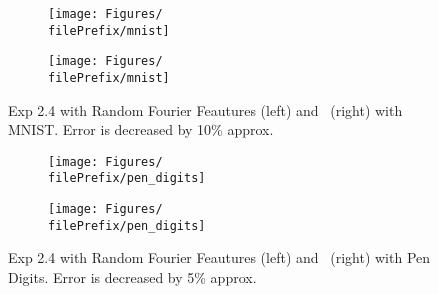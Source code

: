\begin{figure}[H]
  \centering
  \renewcommand{\filePrefix}{\undPrefix/rff}
  \begin{subfigure}[t]{0.5\linewidth}
    \centering\captionsetup{width=.8\linewidth}\texttt{[image: Figures/\\filePrefix/mnist]}
    \label{fig:\undPrefix_mnist}
  \end{subfigure}%
  \renewcommand{\filePrefix}{\undPrefix/nys}%
  \begin{subfigure}[t]{0.5\linewidth}
    \centering\captionsetup{width=.8\linewidth}\texttt{[image: Figures/\\filePrefix/mnist]}
    \label{fig:\undPrefix_mnist}
  \end{subfigure}
  \caption*{Exp 2.4 with Random Fourier Feautures (left) and \Nys\ (right)
   with MNIST. Error is decreased by 10\% approx.}
\end{figure}


\begin{figure}[H]
  \centering
  \renewcommand{\filePrefix}{\undPrefix/rff}
  \begin{subfigure}[t]{0.5\linewidth}
    \centering\captionsetup{width=.8\linewidth}\texttt{[image: Figures/\\filePrefix/pen\_digits]}
    \label{fig:\undPrefix_pen_digits}
  \end{subfigure}%
  \renewcommand{\filePrefix}{\undPrefix/nys}%
  \begin{subfigure}[t]{0.5\linewidth}
    \centering\captionsetup{width=.8\linewidth}\texttt{[image: Figures/\\filePrefix/pen\_digits]}
    \label{fig:\undPrefix_pen_digits}
  \end{subfigure}%
  \caption*{Exp 2.4 with Random Fourier Feautures (left) and \Nys\ (right)
   with Pen Digits. Error is decreased by 5\% approx.}
\end{figure}


